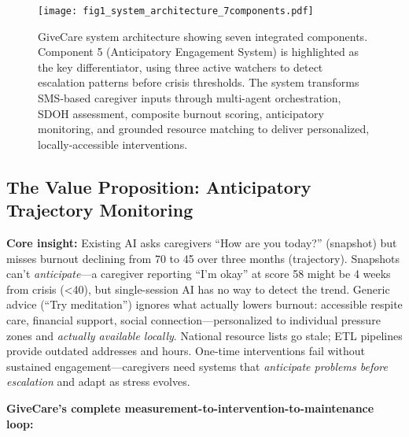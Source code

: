 \documentclass{article}
\begin{document}
\begin{figure}[h]
\centering
\texttt{[image: fig1\_system\_architecture\_7components.pdf]}
\caption{GiveCare system architecture showing seven integrated components. Component 5 (Anticipatory Engagement System) is highlighted as the key differentiator, using three active watchers to detect escalation patterns before crisis thresholds. The system transforms SMS-based caregiver inputs through multi-agent orchestration, SDOH assessment, composite burnout scoring, anticipatory monitoring, and grounded resource matching to deliver personalized, locally-accessible interventions.}
\label{fig:system_architecture}
\end{figure}

\subsection{The Value Proposition: Anticipatory Trajectory Monitoring}

\textbf{Core insight:} Existing AI asks caregivers ``How are you today?'' (snapshot) but misses burnout declining from 70 to 45 over three months (trajectory). Snapshots can't \textit{anticipate}—a caregiver reporting ``I'm okay'' at score 58 might be 4 weeks from crisis (<40), but single-session AI has no way to detect the trend. Generic advice (``Try meditation'') ignores what actually lowers burnout: accessible respite care, financial support, social connection—personalized to individual pressure zones and \textit{actually available locally}. National resource lists go stale; ETL pipelines provide outdated addresses and hours. One-time interventions fail without sustained engagement—caregivers need systems that \textit{anticipate problems before escalation} and adapt as stress evolves.

\textbf{GiveCare's complete measurement-to-intervention-to-maintenance loop:}
\end{document}
